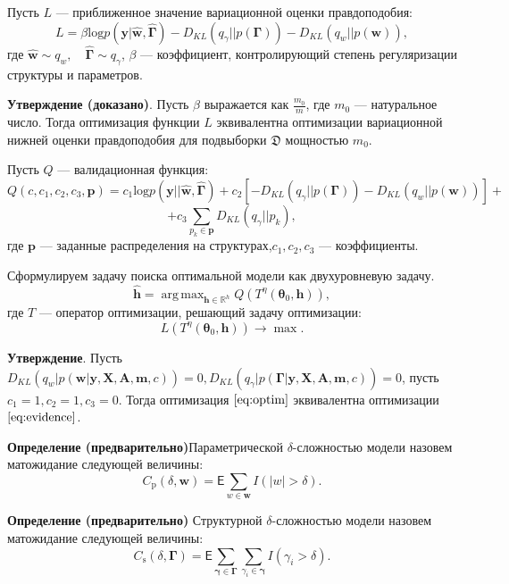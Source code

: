 \documentclass[12pt]{article}
\DeclareMathOperator*{\argmax}{arg\,max}
\begin{document}
Пусть $L$ --- приближенное значение вариационной оценки правдоподобия:
\[
    L = \beta\text{log} p(\mathbf{y}|\hat{\mathbf{w}}, \hat{\boldsymbol{\Gamma}}) - {D_{KL}}(q_\gamma||p(\boldsymbol{\Gamma})) - {D_{KL}}(q_{w}||p(\mathbf{w})),
\]
где $\hat{\mathbf{w}} \sim q_w, \quad \hat{\boldsymbol{\Gamma}} \sim q_\gamma$, $\beta$ --- коэффициент, контролирующий степень регуляризации структуры и параметров.

\textbf{Утверждение (доказано)}. Пусть $\beta$ выражается как $\frac{m_0}{m}$, где $m_0$ --- натуральное число.
Тогда оптимизация функции $L$ эквивалентна оптимизации вариационной нижней оценки правдоподобия для подвыборки  $\mathfrak{D}$ 
мощностью $m_0$.

Пусть $Q$ --- валидационная функция:
\[
    Q(c, c_1, c_2, c_3, \mathbf{p}) = c_1\text{log} p(\mathbf{y}||\hat{\mathbf{w}}, \hat{\boldsymbol{\Gamma}}) + c_2[-{D_{KL}}(q_\gamma||p(\boldsymbol{\Gamma})) - {D_{KL}}(q_{w}||p(\mathbf{w}))] + 
\]
\[
    + c_3\sum_{p_k \in \mathbf{p}}{D_{KL}}(q_\gamma||p_k),
\]
где $\mathbf{p}$ --- заданные распределения на структурах,$c_1,c_2,c_3$ --- коэффициенты.

Сформулируем задачу поиска оптимальной модели как двухуровневую задачу.
\begin{equation}
\label{eq:optim}
	\hat{\mathbf{h}} = \argmax_{\mathbf{h} \in \mathbb{R}^h} Q( T^\eta(\boldsymbol{\theta}_0, \mathbf{h})),
\end{equation}
где $T$ --- оператор оптимизации, решающий задачу оптимизации:
\[
    L(T^\eta(\boldsymbol{\theta}_0, \mathbf{h})) \to \max.
\]


\textbf{Утверждение}. Пусть $D_{KL}(q_w|p(\mathbf{w}|\mathbf{y}, \mathbf{X}, \mathbf{A},\mathbf{m}, c)) = 0, D_{KL}(q_\gamma|p(\boldsymbol{\Gamma}|\mathbf{y}, \mathbf{X}, \mathbf{A},\mathbf{m}, c)) = 0$, пусть $c_1 = 1, c_2 = 1, c_3 = 0$. Тогда оптимизация $\eqref{eq:optim}$ эквивалентна оптимизации $\eqref{eq:evidence}$.

\textbf{Определение (предварительно)}Параметрической $\delta$-сложностью модели назовем матожидание следующей величины:
\[
    C_\text{p}(\delta, \mathbf{w}) = \mathsf{E}\sum_{w \in \mathbf{w}} I(|w| > \delta).
\] 

\textbf{Определение (предварительно)} Структурной $\delta$-сложностью модели назовем матожидание следующей величины:
\[
     C_\text{s}(\delta, \boldsymbol{\Gamma}) = \mathsf{E}\sum_{\boldsymbol{\gamma} \in \boldsymbol{\Gamma}}\sum_{\gamma_i \in \boldsymbol{\gamma}} I(\gamma_i > \delta). 
\]
\end{document}
